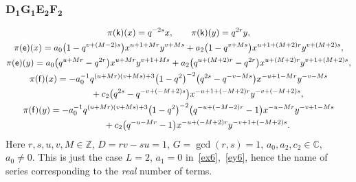 \documentclass[10pt,a4paper]{amsart}
\numberwithin{equation}{section}
\begin{document}
\subsubsection*{$\boldsymbol{D_1G_1E_2F_2}$}
\begin{gather*}
\pi(\mathsf{k})(x)= q^{-2s}x ,\qquad\pi(\mathsf{k})(y)=q^{2r}y ,\\
\pi(\mathsf{e})(x)= a_0\big(1-q^{v+(M-2)s}\big)x^{u+1+Mr}y^{v+Ms}+ a_2\big(1-q^{v+Ms}\big)x^{u+1+(M+2)r}y^{v+(M+2)s} ,\\
\pi(\mathsf{e})(y)= a_0\big(q^{u+Mr}-q^{2r}\big)x^{u+Mr}y^{v+1+Ms}+ a_2\big(q^{u+(M+2)r}-q^{2r}\big)x^{u+(M+2)r}y^{v+1+(M+2)s} ,\\
\pi(\mathsf{f})(x)= -a_0^{-1}q^{(u+Mr)(v+Ms)+3}\big(1-q^2\big)^{-2}\big(q^{2s}-q^{-v-Ms}\big)x^{-u+1-Mr}y^{-v-Ms}\\
\hphantom{\pi(\mathsf{f})(x)=}{}+ c_2\big(q^{2s}-q^{-v+(-M+2)s}\big)x^{-u+1+(-M+2)r}y^{-v+(-M+2)s} ,\\
\pi(\mathsf{f})(y)= -a_0^{-1}q^{(u+Mr)(v+Ms)+3}\big(1-q^2\big)^{-2}\big(q^{-u+(-M-2)r}-1\big)x^{-u-Mr}y^{-v+1-Ms}\\
\hphantom{\pi(\mathsf{f})(y)=}{}+ c_2\big(q^{-u-Mr}-1\big)x^{-u+(-M+2)r}y^{-v+1+(-M+2)s} .
\end{gather*}
Here $r,s,u,v,M\in\mathbb{Z}$, $D=rv-su=1$, $G=\operatorname{gcd}(r,s)=1$, $a_0,a_2,c_2\in\mathbb{C}$, $a_0\ne 0$. This is just the case $L=2$, $a_1=0$ in~\eqref{ex6},~\eqref{ey6}, hence the name of series corresponding to the {\it real} number of terms.
\end{document}
